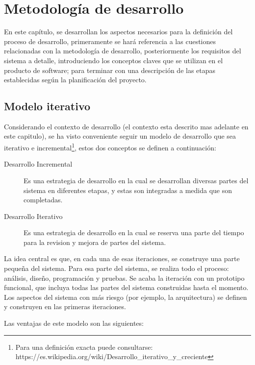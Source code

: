 \chapter{Metodología de desarrollo}

En este capítulo, se desarrollan los aspectos necesarios para la definición del 
proceso de desarrollo, primeramente se hará referencia a las cuestiones 
relacionadas con la metodología de desarrollo, posteriormente los requisitos del
sistema a detalle, introduciendo los conceptos claves que se utilizan en el
producto de software; para terminar con una descripción de las etapas
establecidas según la planificación del proyecto.

\section{Modelo iterativo}

Considerando el contexto de desarrollo (el contexto esta descrito mas adelante
en este capitulo), se ha visto conveniente seguir un modelo de desarrollo que
sea iterativo e incremental\footnote{Para una definición exacta puede
consultarse:
https://es.wikipedia.org/wiki/Desarrollo\_iterativo\_y\_creciente}, estos dos
conceptos se definen a continuación\cite{Cockburn}:

\begin{description}
\item [Desarrollo Incremental] Es una estrategia de desarrollo en la cual se
desarrollan diversas partes del sistema en diferentes etapas, y estas son
integradas a medida que son completadas.
\item [Desarrollo Iterativo] Es una estrategia de desarrollo en la cual se
reserva una parte del tiempo para la revision y mejora de partes del sistema.
\end{description}

La idea central es que, en cada una de esas iteraciones, se construye una parte
pequeña del sistema. Para esa parte del sistema, se realiza todo el proceso:
análisis, diseño, programación y pruebas. Se acaba la iteración con un
prototipo funcional, que incluya todas las partes del sistema construidas hasta
el momento. Los aspectos del sistema con más riesgo (por ejemplo, la
arquitectura) se definen y construyen en las primeras iteraciones.

Las ventajas de este modelo son las siguientes:


